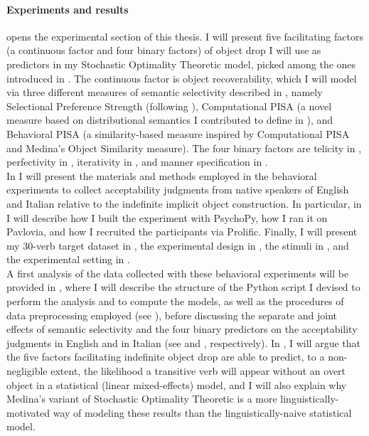 \paragraph{Experiments and results}
 opens the experimental section of this thesis. I will present five facilitating factors (a continuous factor and four binary factors) of object drop I will use as predictors in my Stochastic Optimality Theoretic model, picked among the ones introduced in . The continuous factor is object recoverability, which I will model via three different measures of semantic selectivity described in , namely  Selectional Preference Strength (following \textcite{Medina2007}), Computational PISA (a novel measure based on distributional semantics I contributed to define in \textcite{CappelliLenciPISA}), and Behavioral PISA (a similarity-based measure inspired by Computational PISA and Medina's Object Similarity measure). The four binary factors are telicity in , perfectivity in , iterativity in , and manner specification in .\\
In  I will present the materials and methods employed in the behavioral experiments to collect acceptability judgments from native speakers of English and Italian relative to the indefinite implicit object construction. In particular, in  I will describe how I built the experiment with PsychoPy, how I ran it on Pavlovia, and how I recruited the participants via Prolific. Finally, I will present my 30-verb target dataset in , the experimental design in , the stimuli in , and the experimental setting in .\\
A first analysis of the data collected with these behavioral experiments will be provided in , where I will describe the structure of the Python script I devised to perform the analysis and to compute the models, as well as the procedures of data preprocessing employed (see ), before discussing the separate and joint effects of semantic selectivity and the four binary predictors on the acceptability judgments in English and in Italian (see  and , respectively). In , I will argue that the five factors facilitating indefinite object drop are able to predict, to a non-negligible extent, the likelihood a transitive verb will appear without an overt object in a statistical (linear mixed-effects) model, and I will also explain why Medina's variant of Stochastic Optimality Theoretic is a more linguistically-motivated way of modeling these results than the linguistically-naive statistical model.\\
